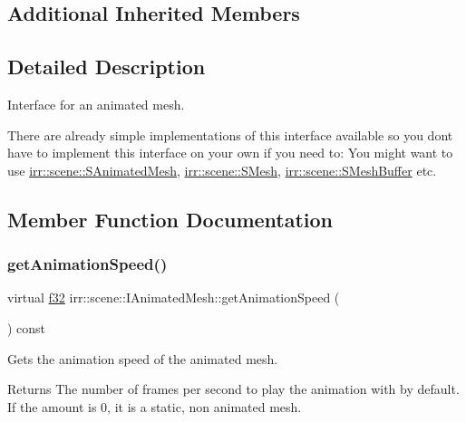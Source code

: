 \subsection*{Additional Inherited Members}


\subsection{Detailed Description}
Interface for an animated mesh. 

There are already simple implementations of this interface available so you don\textquotesingle{}t have to implement this interface on your own if you need to\+: You might want to use \hyperlink{structirr_1_1scene_1_1SAnimatedMesh}{irr\+::scene\+::\+S\+Animated\+Mesh}, \hyperlink{structirr_1_1scene_1_1SMesh}{irr\+::scene\+::\+S\+Mesh}, \hyperlink{namespaceirr_1_1scene_a76de145884afd2965d09c28d6bf89616}{irr\+::scene\+::\+S\+Mesh\+Buffer} etc. 

\subsection{Member Function Documentation}
\mbox{\label{classirr_1_1scene_1_1IAnimatedMesh_acb4249295319c8240d5bedc167417435}} 
\subsubsection{\texorpdfstring{get\+Animation\+Speed()}{getAnimationSpeed()}}
{\footnotesize\ttfamily virtual \hyperlink{namespaceirr_a0277be98d67dc26ff93b1a6a1d086b07}{f32} irr\+::scene\+::\+I\+Animated\+Mesh\+::get\+Animation\+Speed (\begin{DoxyParamCaption}{ }\end{DoxyParamCaption}) const\hspace{0.3cm}{\ttfamily [pure virtual]}}



Gets the animation speed of the animated mesh. 

\begin{DoxyReturn}{Returns}
The number of frames per second to play the animation with by default. If the amount is 0, it is a static, non animated mesh. 
\end{DoxyReturn}


